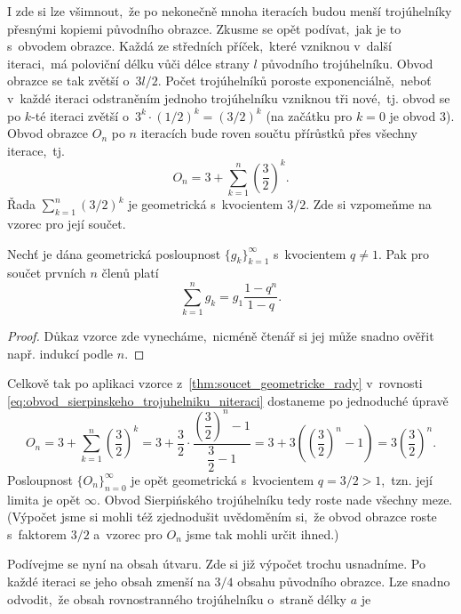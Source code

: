 I zde si lze všimnout,~že po nekonečně mnoha iteracích budou menší trojúhelníky přesnými kopiemi původního obrazce. Zkusme se opět podívat,~jak je to s~obvodem obrazce. Každá ze středních příček,~které vzniknou v~další iteraci,~má poloviční délku vůči délce strany $l$ původního trojúhelníku. Obvod obrazce se tak zvětší o~$3l/2$. Počet trojúhelníků poroste exponenciálně,~neboť v~každé iteraci odstraněním jednoho trojúhelníku vzniknou tři nové,~tj. obvod se po $k$-té iteraci zvětší o~$3^k\cdot(1/2)^k=(3/2)^k$ (na začátku pro $k=0$ je obvod $3$). Obvod obrazce $O_n$ po $n$ iteracích bude roven součtu přírůstků přes všechny iterace,~tj.
\begin{equation}\label{eq:obvod_sierpinskeho_trojuhelniku_niteraci}
    O_n=3+\sum_{k=1}^n{\left(\dfrac{3}{2}\right)^k}.
\end{equation}
Řada $\sum_{k=1}^{n}(3/2)^k$ je geometrická s~kvocientem $3/2$. Zde si vzpomeňme na vzorec pro její součet.
\begin{theorem}\label{thm:soucet_geometricke_rady}
    Nechť je dána geometrická posloupnost $\{g_k\}_{k=1}^\infty$ s~kvocientem $q\neq 1$. Pak pro součet prvních $n$ členů platí
    \begin{equation*}
        \sum_{k=1}^{n}{g_k}=g_1\dfrac{1-q^n}{1-q}.
    \end{equation*}
\end{theorem}
\begin{proof}
    Důkaz vzorce zde vynecháme,~nicméně čtenář si jej může snadno ověřit např. indukcí podle $n$. 
\end{proof}
Celkově tak po aplikaci vzorce z~\ref{thm:soucet_geometricke_rady} v~rovnosti \eqref{eq:obvod_sierpinskeho_trojuhelniku_niteraci} dostaneme po jednoduché úpravě
\begin{equation*}
    O_n=3+\sum_{k=1}^n{\left(\dfrac{3}{2}\right)^k}=3+\dfrac{3}{2}\cdot\dfrac{\left(\dfrac{3}{2}\right)^n-1}{\dfrac{3}{2}-1}=3+3\left(\left(\dfrac{3}{2}\right)^n-1\right)=3\left(\dfrac{3}{2}\right)^n.
\end{equation*}
Posloupnost $\{O_n\}_{n=0}^\infty$ je opět geometrická s~kvocientem $q=3/2>1$,~tzn. její limita je opět $\infty$. Obvod Sierpińského trojúhelníku tedy roste nade všechny meze. (Výpočet jsme si mohli též zjednodušit uvědoměním si,~že obvod obrazce roste s~faktorem $3/2$ a~vzorec pro $O_n$ jsme tak mohli určit ihned.)\par
Podívejme se nyní na obsah útvaru. Zde si již výpočet trochu usnadníme. Po každé iteraci se jeho obsah zmenší na $3/4$ obsahu původního obrazce. Lze snadno odvodit,~že obsah rovnostranného trojúhelníku o~straně délky $a$ je

